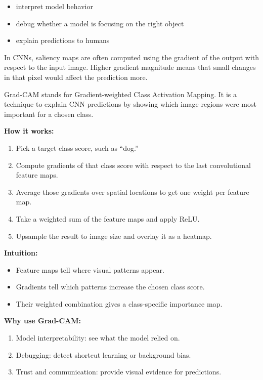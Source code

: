 \documentclass[12pt]{report}
\begin{document}
\begin{itemize}
	\item interpret model behavior
	\item debug whether a model is focusing on the right object
	\item explain predictions to humans
\end{itemize}

In CNNs, saliency maps are often computed using the gradient of the output with respect to the input image. Higher gradient magnitude means that small changes in that pixel would affect the prediction more.


Grad-CAM stands for Gradient-weighted Class Activation Mapping. It is a technique to explain CNN predictions by showing which image regions were most important for a chosen class.

\textbf{How it works:}
\begin{enumerate}
	\item Pick a target class score, such as ``dog.''
	\item Compute gradients of that class score with respect to the last convolutional feature maps.
	\item Average those gradients over spatial locations to get one weight per feature map.
	\item Take a weighted sum of the feature maps and apply ReLU.
	\item Upsample the result to image size and overlay it as a heatmap.
\end{enumerate}

\textbf{Intuition:}
\begin{itemize}
	\item Feature maps tell where visual patterns appear.
	\item Gradients tell which patterns increase the chosen class score.
	\item Their weighted combination gives a class-specific importance map.
\end{itemize}

\textbf{Why use Grad-CAM:}
\begin{enumerate}
	\item Model interpretability: see what the model relied on.
	\item Debugging: detect shortcut learning or background bias.
	\item Trust and communication: provide visual evidence for predictions.
\end{enumerate}
\end{document}
